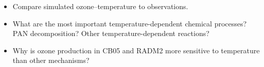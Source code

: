 \begin{BlueBox}
    \vskip-1cm
    \begin{block}{}
        \begin{itemize}
            \item Compare simulated ozone--temperature to observations. \vspace{15mm}
            \item What are the most important temperature-dependent chemical processes? PAN decomposition? Other temperature-dependent reactions? \vspace{15mm}
            \item Why is ozone production in CB05 and RADM2 more sensitive to temperature than other mechanisms? \vspace{15mm}
        \end{itemize}        
    \end{block}
\end{BlueBox}
